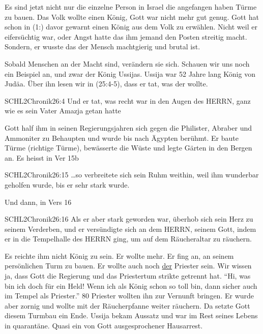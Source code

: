 \documentclass[14pt]{../../inc/mybib}
\newenvironment{block}[1][]{%
  \vspace{1.5em}%
  \noindent\textbf{#1}\par%
  \vspace{0.0em}%
}{%
  \vspace{1em}%
}
\begin{document}
\begin{block}

    Es sind jetzt nicht nur die einzelne Person in Israel die angefangen haben Türme zu bauen. Das Volk wollte einen König, Gott war nicht mehr gut genug. Gott hat schon in (1:) davor gewarnt einen König aus dem Volk zu erwählen. Nicht weil er eifersüchtig war, oder Angst hatte das ihm jemand den Posten streitig macht. Sondern, er wusste das der Mensch machtgierig und brutal ist.
    
    Sobald Menschen an der Macht sind, verändern sie sich. Schauen wir uns noch ein Beispiel an, und zwar der König Ussijas. Ussija war 52 Jahre lang König von Judäa. Über ihn lesen wir in (25:4-5), dass er tat, was der \herr{} wollte. 
    \begin{bibelbox}{SCHL}{2Chronik}{26:4}
        Und er tat, was recht war in den Augen des HERRN, ganz wie es sein Vater Amazja getan hatte
    \end{bibelbox} 
    Gott half ihm in seinen Regierungsjahren sich gegen die Philister, Abraber und Ammoniter zu Behaupten und wurde bis nach Ägypten berühmt. Er baute Türme (richtige Türme), bewässerte die Wüste und legte Gärten in den Bergen an. Es heisst in Ver 15b
    \begin{bibelbox}{SCHL}{2Chronik}{26:15}
        \dots so verbreitete sich sein Ruhm weithin, weil ihm wunderbar geholfen wurde, bis er sehr stark wurde.
    \end{bibelbox} 

    Und dann, in Vers 16
    \begin{bibelbox}{SCHL}{2Chronik}{26:16}
        Als er aber stark geworden war, überhob sich sein Herz zu seinem Verderben, und er versündigte sich an dem HERRN, seinem Gott, indem er in die Tempelhalle des HERRN ging, um auf dem Räucheraltar zu räuchern.
    \end{bibelbox} 
    Es reichte ihm nicht König zu sein. Er wollte mehr. Er fing an, an seinem persönlichen Turm zu bauen. Er wollte auch noch \underline{der} Priester sein. Wir wissen ja, dass Gott die Regierung und das Priestertum strikte getrennt hat. 
    \enquote{Hi, was bin ich doch für ein Held! Wenn ich als König schon so toll bin, dann sicher auch im Tempel als Priester.} 80 Priester wollten ihn zur Vernunft bringen. Er wurde aber zornig und wollte mit der Räucherpfanne weiter räuchern. Da setzte Gott diesem Turmbau ein Ende. Ussija bekam Aussatz und war im Rest seines Lebens in quarantäne. Quasi ein von Gott ausgesprochener Hausarrest.
\end{block}
\end{document}
